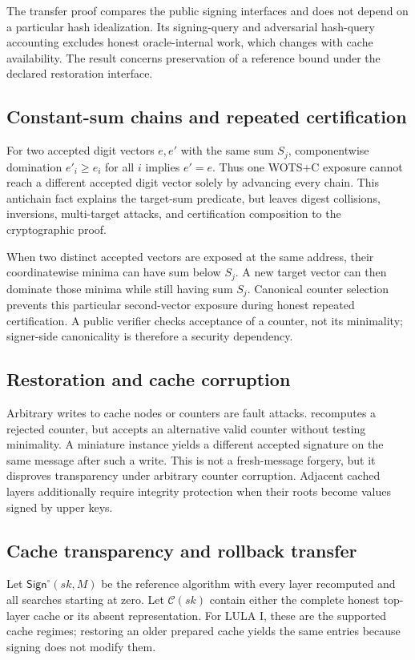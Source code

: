 \documentclass[a4paper,envcountsame,runningheads]{llncs}
\newcommand{\Sign}{\mathsf{Sign}}
\begin{document}
The transfer proof compares the public signing interfaces and does not depend on a particular hash idealization. Its signing-query and adversarial hash-query accounting excludes honest oracle-internal work, which changes with cache availability. The result concerns preservation of a reference bound under the declared restoration interface.

\subsection{Constant-sum chains and repeated certification}
For two accepted digit vectors $e,e'$ with the same sum $S_j$, componentwise domination $e'_i\ge e_i$ for all $i$ implies $e'=e$. Thus one WOTS+C exposure cannot reach a different accepted digit vector solely by advancing every chain. This antichain fact explains the target-sum predicate, but leaves digest collisions, inversions, multi-target attacks, and certification composition to the cryptographic proof.

When two distinct accepted vectors are exposed at the same address, their coordinatewise minima can have sum below $S_j$. A new target vector can then dominate those minima while still having sum $S_j$. Canonical counter selection prevents this particular second-vector exposure during honest repeated certification. A public verifier checks acceptance of a counter, not its minimality; signer-side canonicality is therefore a security dependency.

\subsection{Restoration and cache corruption}
Arbitrary writes to cache nodes or counters are fault attacks.  recomputes a rejected counter, but accepts an alternative valid counter without testing minimality. A miniature instance yields a different accepted signature on the same message after such a write. This is not a fresh-message forgery, but it disproves transparency under arbitrary counter corruption. Adjacent cached layers additionally require integrity protection when their roots become values signed by upper keys.

\subsection{Cache transparency and rollback transfer}\label{sec:rollback}
Let $\Sign^\circ(sk,M)$ be the reference algorithm with every layer recomputed and all searches starting at zero. Let $\mathcal C(sk)$ contain either the complete honest top-layer cache or its absent representation. For LULA I, these are the supported cache regimes; restoring an older prepared cache yields the same entries because signing does not modify them.
\end{document}

